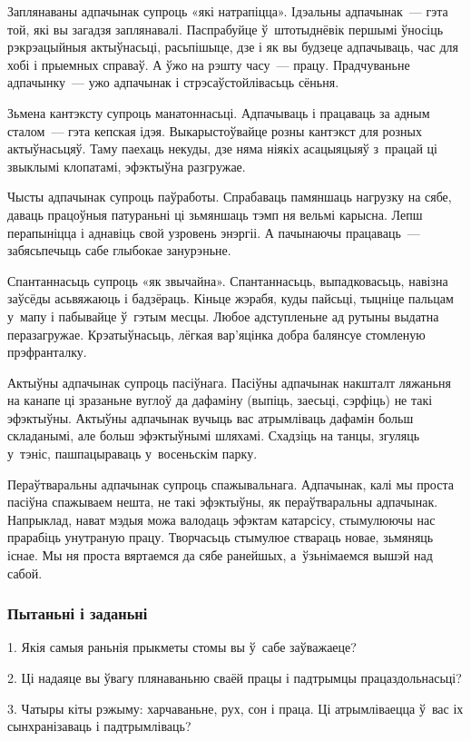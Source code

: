 Заплянаваны адпачынак супроць «які натрапіцца». Ідэальны адпачынак~--- гэта той, які вы загадзя заплянавалі. Паспрабуйце ў~штотыднёвік першымі ўносіць рэкрэацыйныя актыўнасьці, расьпішыце, дзе і як вы будзеце адпачываць, час для хобі і прыемных справаў. А ўжо на рэшту часу~--- працу. Прадчуваньне адпачынку~--- ужо адпачынак і стрэсаўстойлівасьць сёньня.

Зьмена кантэксту супроць манатоннасьці. Адпачываць і працаваць за адным сталом~--- гэта кепская ідэя. Выкарыстоўвайце розны кантэкст для розных актыўнасьцяў. Таму паехаць некуды, дзе няма ніякіх асацыяцыяў з~працай ці звыклымі клопатамі, эфэктыўна разгружае.

Чысты адпачынак супроць паўработы. Спрабаваць памяншаць нагрузку на сябе, даваць працоўныя патураньні ці зьмяншаць тэмп ня вельмі карысна. Лепш перапыніцца і аднавіць свой узровень энэргіі. А пачынаючы працаваць~--- забясьпечыць сабе глыбокае занурэньне.

Спантаннасьць супроць «як звычайна». Спантаннасьць, выпадковасьць, навізна заўсёды асьвяжаюць і бадзёраць. Кіньце жэрабя, куды пайсьці, тыцніце пальцам у~мапу і пабывайце ў~гэтым месцы. Любое адступленьне ад рутыны выдатна перазагружае. Крэатыўнасьць, лёгкая вар'яцінка добра балянсуе стомленую прэфранталку.

Актыўны адпачынак супроць пасіўнага. Пасіўны адпачынак накшталт ляжаньня на канапе ці зразаньне вуглоў да дафаміну (выпіць, заесьці, сэрфіць) не такі эфэктыўны. Актыўны адпачынак вучыць вас атрымліваць дафамін больш складанымі, але больш эфэктыўнымі шляхамі. Схадзіць на танцы, згуляць у~тэніс, пашпацыраваць у~восеньскім парку.

Пераўтваральны адпачынак супроць спажывальнага. Адпачынак, калі мы проста пасіўна спажываем нешта, не такі эфэктыўны, як пераўтваральны адпачынак. Напрыклад, нават мэдыя можа валодаць эфэктам катарсісу, стымулюючы нас прарабіць унутраную працу. Творчасьць стымулюе ствараць новае, зьмяняць існае. Мы ня проста вяртаемся да сябе ранейшых, а~ўзьнімаемся вышэй над сабой.

\subsubsection{Пытаньні і заданьні}

1. Якія самыя раньнія прыкметы стомы вы ў~сабе заўважаеце?

2. Ці надаяце вы ўвагу плянаваньню сваёй працы і падтрымцы працаздольнасьці?

3. Чатыры кіты рэжыму: харчаваньне, рух, сон і праца. Ці атрымліваецца ў~вас іх сынхранізаваць і падтрымліваць?


